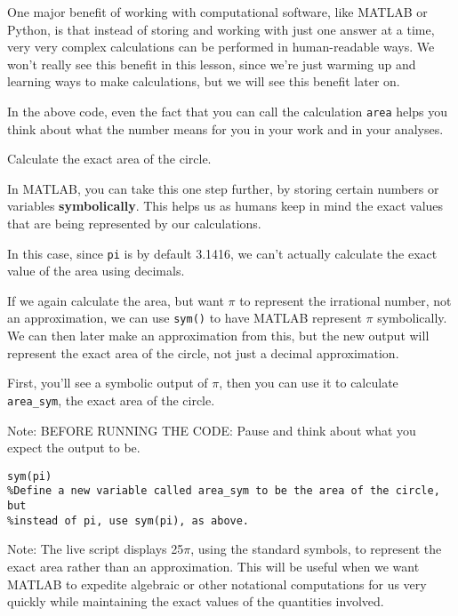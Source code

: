 \documentclass{ximera}
\begin{document}
One major benefit of working with computational software, like MATLAB or Python, is that instead of storing and working with just one answer at a time, very very complex calculations can be performed in human-readable ways. We won't really see this benefit in this lesson, since we're just warming up and learning ways to make calculations, but we will see this benefit later on.

In the above code, even the fact that you can call the calculation \texttt{area} helps you think about what the number means for you in your work and in your analyses.

\begin{example} Calculate the exact area of the circle.

In MATLAB, you can take this one step further, by storing certain numbers or variables \textbf{symbolically}. This helps us as humans keep in mind the exact values that are being represented by our calculations. 

In this case, since \texttt{pi} is by default 3.1416, we can't actually calculate the exact value of the area using decimals.

If we again calculate the area, but want \(\pi\) to represent the irrational number, not an approximation, we can use \texttt{sym()} to have MATLAB represent \(\pi\) symbolically. We can then later make an approximation from this, but the new output will represent the exact area of the circle, not just a decimal approximation.

First, you'll see a symbolic output of \(\pi\), then you can use it to calculate \texttt{area\_sym}, the exact area of the circle.

\begin{remark}
Note: BEFORE RUNNING THE CODE: Pause and think about what you expect the output to be.
\end{remark}

\begin{verbatim}
sym(pi)
%Define a new variable called area_sym to be the area of the circle, but
%instead of pi, use sym(pi), as above.
\end{verbatim}

\begin{remark}
Note: The live script displays 25$\pi$, using the standard symbols, to represent the exact area rather than an approximation. This will be useful when we want MATLAB to expedite algebraic or other notational computations for us very quickly while maintaining the exact values of the quantities involved.
\end{remark}


\end{example}
\end{document}
